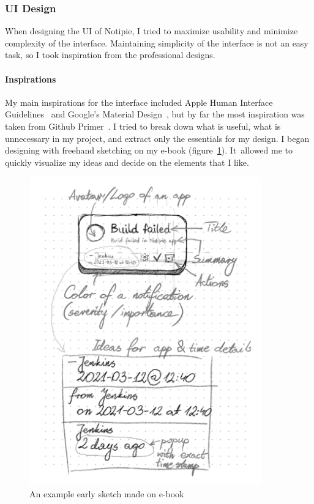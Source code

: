 \subsubsection{UI Design}\label{sec:ui-design}

When designing the \ac{UI} of Notipie,
I tried to maximize usability
and minimize complexity of the interface.
Maintaining simplicity of the interface is not an easy task,
so I took inspiration from the professional designs.

\paragraph*{Inspirations}\label{sec:inspirations}

My main inspirations for the interface included
Apple Human Interface Guidelines~\cite{apple_inc_human_2022}
and Google's Material Design~\cite{google_llc_material_2022},
but by far the most inspiration was taken from
Github Primer~\cite{github_inc_primer_2022}.
I tried to break down what is useful,
what is unnecessary in my project,
and extract only the essentials for my design.
I began designing with freehand sketching
on my e-book (figure~\ref{fig:early-ui-sketches}).
It~allowed me to quickly visualize my ideas
and decide on the elements that I like.

\begin{figure}[ht]
      \centering
      \includegraphics[width=10cm,keepaspectratio]{img/early_ui_sketches.png}
      \caption{An example early sketch made on e-book}
      \label{fig:early-ui-sketches}
\end{figure}

